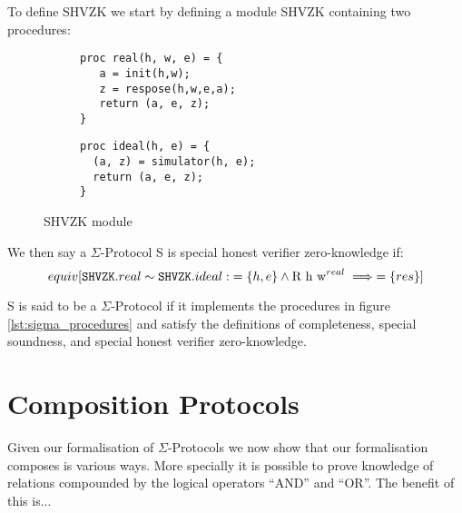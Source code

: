 \begin{definition}
  To define SHVZK we start by defining a module SHVZK containing two procedures:
\label{def:sigma:shvzk}
  \begin{figure}[ht]
    \centering
    \begin{subfigure}{0.48\textwidth }
\begin{lstlisting}[mathescape]
proc real(h, w, e) = {
   a = init(h,w);
   z = respose(h,w,e,a);
   return (a, e, z);
}
\end{lstlisting}
    \end{subfigure}
    \hfill
    \begin{subfigure}{0.48\textwidth }
\begin{lstlisting}[mathescape]
proc ideal(h, e) = {
  (a, z) = simulator(h, e);
  return (a, e, z);
}
\end{lstlisting}
    \end{subfigure}
    \caption{SHVZK module}
  \end{figure}
  We then say a $\Sigma$-Protocol S is special honest verifier zero-knowledge
  if:
  \[
    equiv[\texttt{SHVZK}.real \sim \texttt{SHVZK}.ideal :\; =\{h, e\} \land \text{R
    h w}^{real} \implies =\{res\}]
  \]
\end{definition}

\begin{definition}
\label{def:sigma-protocol}
  S is said to be a $\Sigma$-Protocol if it implements the procedures in figure
  \ref{lst:sigma_procedures} and satisfy the definitions of completeness,
  special soundness, and special honest verifier zero-knowledge.
\end{definition}




\section{Composition Protocols}
\label{sec:sigma_comp}
Given our formalisation of $\Sigma$-Protocols we now show that our formalisation
composes is various ways. More specially it is possible to prove knowledge of
relations compounded by the logical operators ``AND'' and ``OR''.
The benefit of this is...

